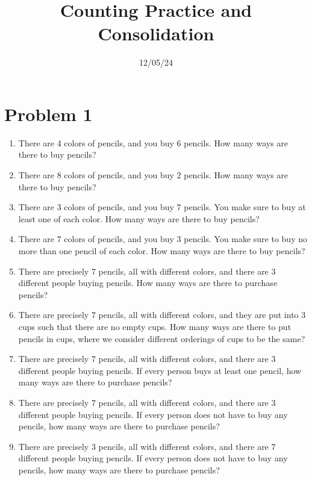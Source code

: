 \documentclass[11pt, letterpaper]{report}
\title{Counting Practice and Consolidation}
\date{12/05/24}
\begin{document}
\makeproblem
\section*{Problem 1}
\begin{enumerate}
	\item There are 4 colors of pencils, and you buy 6 pencils. How many ways are there to buy pencils?
	\item There are 8 colors of pencils, and you buy 2 pencils. How many ways are there to buy pencils?
	\item There are $3$ colors of pencils, and you buy $7$ pencils. You make sure to buy at least one of each color. How many ways are there to buy pencils?
	\item There are $7$ colors of pencils, and you buy $3$ pencils. You make sure to buy no more than one pencil of each color. How many ways are there to buy pencils?
	\item There are precisely $7$ pencils, all with different colors, and there are $3$ different people buying pencils. How many ways are there to purchase pencils?
	\item There are precisely $7$ pencils, all with different colors, and they are put into $3$ cups such that there are no empty cups. How many ways are there to put pencils in cups, where we consider different orderings of cups to be the same?
	\item There are precisely $7$ pencils, all with different colors, and there are $3$ different people buying pencils. If every person buys at least one pencil, how many ways are there to purchase pencils?
	\item There are precisely $7$ pencils, all with different colors, and there are $3$ different people buying pencils. If every person does not have to buy any pencils, how many ways are there to purchase pencils?
	\item There are precisely $3$ pencils, all with different colors, and there are $7$ different people buying pencils. If every person does not have to buy any pencils, how many ways are there to purchase pencils?
\end{enumerate}
\end{document}
